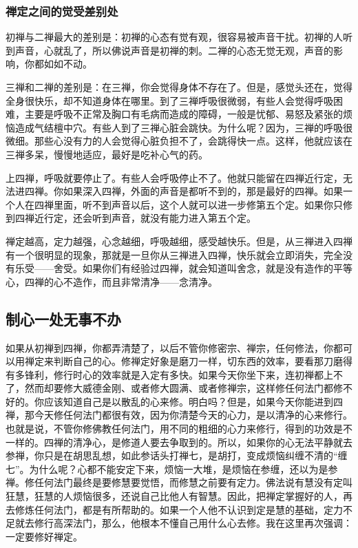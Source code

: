 \documentclass{book}
\begin{document}
\subsubsection{禅定之间的觉受差别处}

初禅与二禅最大的差别是：初禅的心态有觉有观，很容易被声音干扰。初禅的人听到声音，心就乱了，所以佛说声音是初禅的刺。二禅的心态无觉无观，声音的影响，你都如如不动。

三禅和二禅的差别是：在三禅，你会觉得身体不存在了。但是，感觉头还在，觉得全身很快乐，却不知道身体在哪里。到了三禅呼吸很微弱，有些人会觉得呼吸困难，主要是呼吸不正常及胸口有毛病而造成的障碍，一般是忧郁、易怒及紧张的烦恼造成气结檀中穴。有些人到了三禅心脏会跳快。为什么呢？因为，三禅的呼吸很微细。那些心没有力的人会觉得心脏负担不了，会跳得快一点。这样，他就应该在三禅多呆，慢慢地适应，最好是吃补心气的药。

上四禅，呼吸就要停止了。有些人会呼吸停止不了。他就只能留在四禅近行定，无法进四禅。你如果深入四禅，外面的声音是都听不到的，那是最好的四禅。如果一个人在四禅里面，听不到声音以后，这个人就可以进一步修第五个定。如果你只修到四禅近行定，还会听到声音，就没有能力进入第五个定。

禅定越高，定力越强，心念越细，呼吸越细，感受越快乐。但是，从三禅进入四禅有一个很明显的现象，那就是一旦你从三禅进入四禅，快乐就会立即消失，完全没有乐受——舍受。如果你们有经验过四禅，就会知道叫舍念，就是没有造作的平等心，四禅的心不造作，而且非常清净——念清净。

\subsection{制心一处无事不办}

如果从初禅到四禅，你都弄清楚了，以后不管你修密宗、禅宗，任何修法，你都可以用禅定来判断自己的心。修禅定好象是磨刀一样，切东西的效率，要看那刀磨得有多锋利，修行时心的效率就是入定有多快。如果今天你坐下来，连初禅都上不了，然而却要修大威德金刚、或者修大圆满、或者修禅宗，这样修任何法门都修不好的。你应该知道自己是以散乱的心来修。明白吗？但是，如果今天你能进到四禅，那今天修任何法门都很有效，因为你清楚今天的心力，是以清净的心来修行。也就是说，不管你修佛教任何法门，用不同的粗细的心力来修行，得到的功效是不一样的。四禅的清净心，是修道人要去争取到的。所以，如果你的心无法平静就去参禅，你只是在胡思乱想，如此参话头打禅七，是胡打，变成烦恼纠缠不清的``缠七''。为什么呢？心都不能安定下来，烦恼一大堆，是烦恼在参缠，还以为是参禅。修任何法门最终是要修慧要觉悟，而修慧之前要有定力。佛法说有慧没有定叫狂慧，狂慧的人烦恼很多，还说自己比他人有智慧。因此，把禅定掌握好的人，再去修炼任何法门，都是有所帮助的。如果一个人他不认识到定是慧的基础，定力不足就去修行高深法门，那么，他根本不懂自己用什么心去修。我在这里再次强调：一定要修好禅定。
\end{document}
